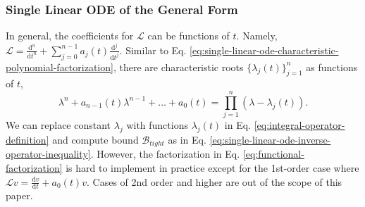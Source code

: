 \documentclass[accepted]{uai2023}
\newcommand{\Bound}{\mathcal{B}}
\renewcommand{\L}{\mathcal{L}}
\begin{document}
\subsubsection{Single Linear ODE of the General Form}
   In general, the coefficients for $\L$ can be functions of $t$. Namely, $\L = \frac{\mathrm d^n}{\mathrm d t^n} +  \sum_{j=0}^{n-1}a_j(t)\frac{\mathrm d^j}{\mathrm d t^j}$.
   Similar to Eq. \ref{eq:single-linear-ode-characteristic-polynomial-factorization}, there are characteristic roots $\{\lambda_{j}(t)\}_{j=1}^{n}$ as functions of $t$,
    {
        \smaller
        \begin{equation*} \label{eq:functional-factorization}
            \lambda^n + a_{n-1}(t)\lambda^{n-1} + \dots + a_0(t) = \prod_{j=1}^{n}(\lambda - \lambda_j(t)).
        \end{equation*}
    }
    We can replace constant $\lambda_j$ with functions $\lambda_j(t)$ in Eq. \ref{eq:integral-operator-definition} and compute bound $\Bound_{tight}$ as in Eq. \ref{eq:single-linear-ode-inverse-operator-inequality}.
    However, the factorization in Eq. \ref{eq:functional-factorization} is hard to implement in practice except for the 1st-order case  where $\L v = \frac{\mathrm{d}v}{\mathrm{d}t} + a_0(t)v$. 
    Cases of 2nd order and higher are out of the scope of this paper.
\end{document}
